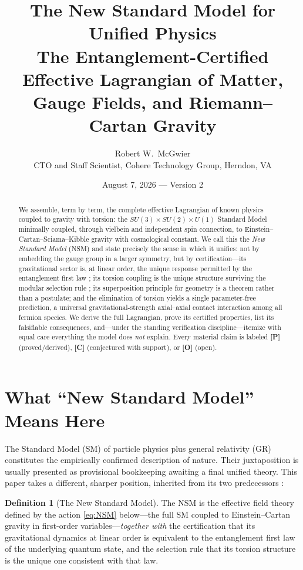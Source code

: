 \documentclass[11pt]{article}
\title{\textbf{The New Standard Model for Unified Physics}\\[4pt]
\large The Entanglement-Certified Effective Lagrangian of Matter,
Gauge Fields, and Riemann--Cartan Gravity}
\author{Robert W.\ McGwier\\
\small CTO and Staff Scientist, Cohere Technology Group, Herndon, VA}
\date{August 7, 2026 --- Version 2}
\theoremstyle{definition}
\newtheorem{definition}[theorem]{Definition}
\newcommand{\pP}{\textbf{[P]}}
\newcommand{\pC}{\textbf{[C]}}
\newcommand{\pO}{\textbf{[O]}}
\begin{document}
\maketitle

\begin{abstract}
\noindent
We assemble, term by term, the complete effective Lagrangian of known
physics coupled to gravity with torsion: the $SU(3)\times SU(2)\times U(1)$
Standard Model minimally coupled, through vielbein and independent spin
connection, to Einstein--Cartan--Sciama--Kibble gravity with cosmological
constant. We call this the \emph{New Standard Model} (NSM) and state
precisely the sense in which it unifies: not by embedding the gauge group
in a larger symmetry, but by certification---its gravitational sector is,
at linear order, the unique response permitted by the entanglement first
law \cite{McGwier2026a}; its torsion coupling is the unique structure
surviving the modular selection rule \cite{McGwier2026b}; its superposition
principle for geometry is a theorem rather than a postulate; and the
elimination of torsion yields a single parameter-free prediction, a
universal gravitational-strength axial--axial contact interaction among
all fermion species. We derive the full Lagrangian, prove its certified
properties, list its falsifiable consequences, and---under the standing
verification discipline---itemize with equal care everything the model
does \emph{not} explain. Every material claim is labeled \pP{}
(proved/derived), \pC{} (conjectured with support), or \pO{} (open).
\end{abstract}

\section{What ``New Standard Model'' Means Here}

The Standard Model (SM) of particle physics
\cite{Glashow1961,Weinberg1967,Salam1968} plus general relativity (GR)
constitutes the empirically confirmed description of nature. Their
juxtaposition is usually presented as provisional bookkeeping awaiting a
final unified theory. This paper takes a different, sharper position,
inherited from its two predecessors \cite{McGwier2026a,McGwier2026b}:

\begin{definition}[The New Standard Model]
The NSM is the effective field theory defined by the action
\eqref{eq:NSM} below---the full SM coupled to Einstein--Cartan gravity in
first-order variables---\emph{together with} the certification that its
gravitational dynamics at linear order is equivalent to the entanglement
first law of the underlying quantum state, and the selection rule that its
torsion structure is the unique one consistent with that law.
\end{definition}
\end{document}
